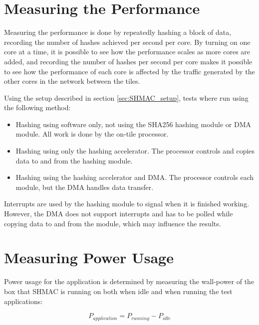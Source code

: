 \section{Measuring the Performance}

Measuring the performance is done by repeatedly hashing a block of data, recording the
number of hashes achieved per second per core. By turning on one core at a time, it
is possible to see how the performance scales as more cores are added, and recording
the number of hashes per second per core makes it possible to see how the performance
of each core is affected by the traffic generated by the other cores in the network
between the tiles.

Using the setup described in section \ref{sec:SHMAC_setup}, tests where run using the
following method:

\begin{itemize}
    \item Hashing using software only, not using the SHA256 hashing module or DMA module.
    All work is done by the on-tile processor.
    \item Hashing using only the hashing accelerator.
    The processor controls and copies data to and from the hashing module.
    \item Hashing using the hashing accelerator and DMA.
    The processor controls each module, but the DMA handles data transfer.
\end{itemize}

Interrupts are used by the hashing module to signal when it is finished working. However,
the DMA does not support interrupts and has to be polled while copying data to and from
the module, which may influence the results.

\section{Measuring Power Usage}

Power usage for the application is determined by measuring the wall-power of the box
that SHMAC is running on both when idle and when running the test applications:

\[P_{application} = P_{running} - P_{idle}\]




